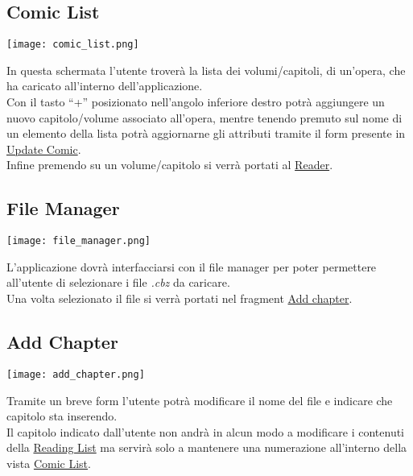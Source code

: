 \documentclass[../Assignment-3-LPSMT.tex]{subfiles}
\begin{document}
\subsection{Comic List}\label{sec:comic_list}

\begin{center}
  \texttt{[image: comic\_list.png]}
\end{center}

In questa schermata l'utente troverà la lista dei volumi/capitoli, di un'opera, che ha caricato all'interno dell'applicazione.\\
Con il tasto ``+'' posizionato nell'angolo inferiore destro potrà aggiungere un nuovo capitolo/volume associato all'opera, mentre tenendo premuto sul nome di un elemento della lista potrà aggiornarne gli attributi tramite il form presente in \hyperref[sec:update_comic]{Update Comic}.\\
Infine premendo su un volume/capitolo si verrà portati al \hyperref[sec:reader]{Reader}.

\subsection{File Manager}

\begin{center}
  \texttt{[image: file\_manager.png]}
\end{center}

L'applicazione dovrà interfacciarsi con il file manager per poter permettere all'utente di selezionare i file \emph{.cbz} da caricare.\\
Una volta selezionato il file si verrà portati nel fragment \hyperref[sec:add_chapter]{Add chapter}.

\subsection{Add Chapter}\label{sec:add_chapter}

\begin{center}
  \texttt{[image: add\_chapter.png]}
\end{center}

Tramite un breve form l'utente potrà modificare il nome del file e indicare che capitolo sta inserendo.\\
Il capitolo indicato dall'utente non andrà in alcun modo a modificare i contenuti della \hyperref[sec:reading_list]{Reading List} ma servirà solo a mantenere una numerazione all'interno della vista \hyperref[sec:comic_list]{Comic List}.
\end{document}
